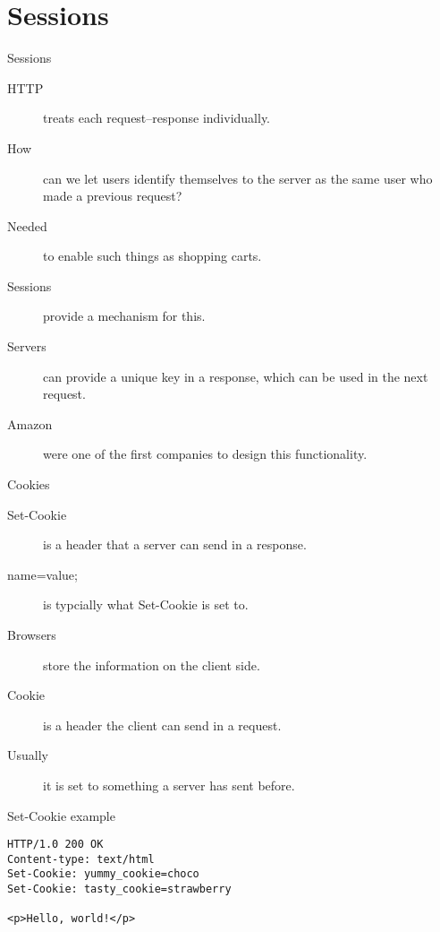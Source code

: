 \section{Sessions}

\begin{frame}{Sessions}
  \begin{description}
    \item[HTTP] treats each request--response individually.
		\item[How] can we let users identify themselves to the server as the same user who made a previous request?
		\item[Needed] to enable such things as shopping carts.
		\item[Sessions] provide a mechanism for this.
		\item[Servers] can provide a unique key in a response, which can be used in the next request.
		\item[Amazon] were one of the first companies to design this functionality.
  \end{description}
\end{frame}


\begin{frame}{Cookies}
  \begin{description}
    \item[Set-Cookie] is a header that a server can send in a response.
		\item[name=value;] is typcially what Set-Cookie is set to.
		\item[Browsers] store the information on the client side.
		\item[Cookie] is a header the client can send in a request.
		\item[Usually] it is set to something a server has sent before.
  \end{description}
\end{frame}


\begin{frame}[fragile]{Set-Cookie example}
  \begin{verbatim}
HTTP/1.0 200 OK
Content-type: text/html
Set-Cookie: yummy_cookie=choco
Set-Cookie: tasty_cookie=strawberry

<p>Hello, world!</p>
  \end{verbatim}
\end{frame}


